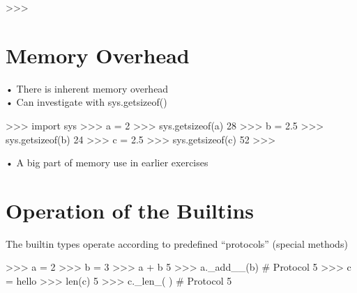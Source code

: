 \documentclass[
  letterpaper,
  DIV=11,
  numbers=noendperiod]{scrreprt}
\newenvironment{Shaded}{\begin{snugshade}}{\end{snugshade}}
\newcommand{\NormalTok}[1]{\textcolor[rgb]{0.00,0.23,0.31}{#1}}
\begin{document}
\begin{Shaded}
\begin{Highlighting}[]
\NormalTok{\textgreater{}\textgreater{}\textgreater{} }
\end{Highlighting}
\end{Shaded}


\chapter{Memory Overhead}\label{memory-overhead}

• There is inherent memory overhead\\
• Can investigate with sys.getsizeof()

\begin{Shaded}
\begin{Highlighting}[]
\NormalTok{\textgreater{}\textgreater{}\textgreater{} import sys  }
\NormalTok{\textgreater{}\textgreater{}\textgreater{} a = 2  }
\NormalTok{\textgreater{}\textgreater{}\textgreater{} sys.getsizeof(a)  }
\NormalTok{28  }
\NormalTok{\textgreater{}\textgreater{}\textgreater{} b = 2.5  }
\NormalTok{\textgreater{}\textgreater{}\textgreater{} sys.getsizeof(b)  }
\NormalTok{24  }
\NormalTok{\textgreater{}\textgreater{}\textgreater{} c = \textquotesingle{}2.5\textquotesingle{}  }
\NormalTok{\textgreater{}\textgreater{}\textgreater{} sys.getsizeof(c)  }
\NormalTok{52  }
\NormalTok{\textgreater{}\textgreater{}\textgreater{} }
\end{Highlighting}
\end{Shaded}

• A big part of memory use in earlier exercises


\chapter{Operation of the Builtins}\label{operation-of-the-builtins}

The builtin types operate according to predefined ``protocols'' (special
methods)

\begin{Shaded}
\begin{Highlighting}[]
\NormalTok{\textgreater{}\textgreater{}\textgreater{} a = 2  }
\NormalTok{\textgreater{}\textgreater{}\textgreater{} b = 3  }
\NormalTok{\textgreater{}\textgreater{}\textgreater{} a + b  }
\NormalTok{5  }
\NormalTok{\textgreater{}\textgreater{}\textgreater{} a.\_add\_\_(b) \# Protocol  }
\NormalTok{5  }
\NormalTok{\textgreater{}\textgreater{}\textgreater{} c = \textquotesingle{}hello\textquotesingle{}  }
\NormalTok{\textgreater{}\textgreater{}\textgreater{} len(c)  }
\NormalTok{5  }
\NormalTok{\textgreater{}\textgreater{}\textgreater{} c.\_len\_( ) \# Protocol  }
\NormalTok{5 }
\end{Highlighting}
\end{Shaded}
\end{document}
